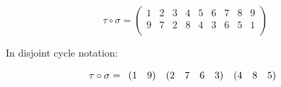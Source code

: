 \documentclass[a4paper]{article}
\begin{document}
\begin{myparindent}{0pt}
\[
    \tau \circ \sigma =
    \begin{pmatrix}
        1 & 2 & 3 & 4 & 5 & 6 & 7 & 8 & 9 \\
        9 & 7 & 2 & 8 & 4 & 3 & 6 & 5 & 1 \\
    \end{pmatrix}
\]

In disjoint cycle notation:

\[
    \noindent \tau \circ \sigma = \begin{array}{rr} (1 & 9) \end{array}
    \noindent \begin{array}{rrrrr} (2 & 7 & 6 & 3) \end{array}
    \noindent \begin{array}{rrr} (4 & 8 & 5) \end{array}
\]

\end{myparindent}
\end{document}
